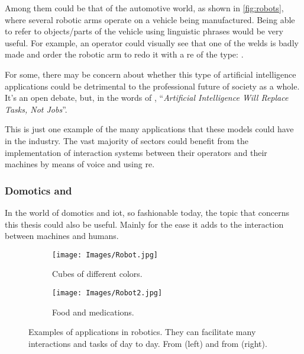 Among them could be that of the automotive world, as shown in
\vref{fig:robots}, where several robotic arms operate on a vehicle being
manufactured. Being able to refer to objects/parts of the vehicle using
linguistic phrases would be very useful. For example, an operator could
visually see that one of the welds is badly made and order the robotic arm to
redo it with a \gls{re} of the type: .

\begin{remarkBox}
  For some, there may be concern about whether this type of artificial
  intelligence applications could be detrimental to the professional future of
  society as a whole. It's an open debate, but, in the words of
  \citeauthor*{contributor18:artif_intel_will_replac_tasks_not_jobs}
  \cite{contributor18:artif_intel_will_replac_tasks_not_jobs},
  ``\textit{Artificial Intelligence Will Replace Tasks, Not Jobs}''.
\end{remarkBox}

This is just one example of the many applications that these models could have
in the industry. The vast majority of sectors could benefit from the
implementation of interaction systems between their operators and their
machines by means of voice and using \gls{re}.

\subsubsection{Domotics and }

In the world of domotics and \gls{iot}, so fashionable today, the topic that
concerns this thesis could also be useful. Mainly for the ease it adds to the
interaction between machines and humans.

\begin{figure}[ht]
  \centering
  \begin{subfigure}[t]{.55\textwidth}
    \centering
    \caption{Cubes of different colors.}
    \texttt{[image: Images/Robot.jpg]}
  \end{subfigure}\hfill
  \begin{subfigure}[t]{.4\textwidth}
    \centering
    \caption{Food and medications.}
    \texttt{[image: Images/Robot2.jpg]}
  \end{subfigure}
  \caption[Examples of applications in robotics]{Examples of applications in
    robotics. They can facilitate many interactions and tasks of day to
    day. From  (left) and from
     (right).}\label{fig:robot}
\end{figure}

